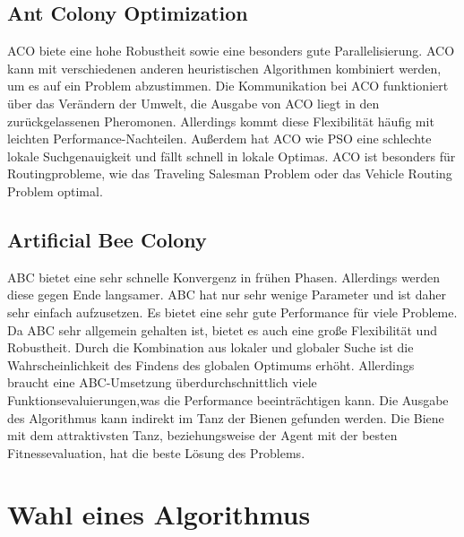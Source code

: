 \subsection{Ant Colony Optimization}
ACO biete eine hohe Robustheit sowie eine besonders gute Parallelisierung.  ACO kann mit verschiedenen anderen heuristischen Algorithmen kombiniert werden, um es auf ein Problem abzustimmen. Die Kommunikation bei ACO funktioniert über das Verändern der Umwelt, die Ausgabe von ACO liegt in den zurückgelassenen Pheromonen. Allerdings kommt diese Flexibilität häufig mit leichten Performance-Nachteilen. Außerdem hat ACO wie PSO eine schlechte lokale Suchgenauigkeit und fällt schnell in lokale Optimas. ACO ist besonders für Routingprobleme, wie das Traveling Salesman Problem \cite{stutzle1997max} oder das Vehicle Routing Problem \cite{gambardella1999macs} optimal.


\subsection{Artificial Bee Colony}
ABC bietet eine sehr schnelle Konvergenz in frühen Phasen. Allerdings werden diese gegen Ende langsamer.  ABC hat nur sehr wenige Parameter und ist daher sehr einfach aufzusetzen. Es bietet eine sehr gute Performance für viele Probleme. Da ABC sehr allgemein gehalten ist, bietet es auch eine große Flexibilität und Robustheit. Durch die Kombination aus lokaler und globaler Suche ist die Wahrscheinlichkeit des Findens des globalen Optimums erhöht. Allerdings braucht eine ABC-Umsetzung überdurchschnittlich viele Funktionsevaluierungen,was die Performance beeinträchtigen kann. Die Ausgabe des Algorithmus kann indirekt im Tanz der Bienen gefunden werden. Die Biene mit dem attraktivsten Tanz, beziehungsweise der Agent mit der besten Fitnessevaluation, hat die beste Lösung des Problems.

\section{Wahl eines Algorithmus}

